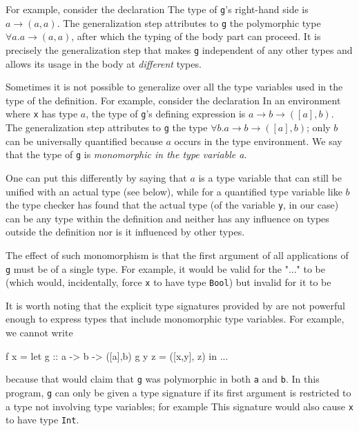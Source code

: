 For example, consider the declaration 
The type of \texttt{g}'s right-hand side is $a \rightarrow{} (a,a)$. The generalization step attributes to \texttt{g} the polymorphic type $\forall a. a \rightarrow{} (a,a)$, after which the typing of the body part can proceed. It is precisely the generalization step that makes \texttt{g} independent of any other types and allows its usage in the body at \emph{different} types.

Sometimes it is not possible to generalize over all the type variables used in the type of the definition. For example, consider the declaration  
In an environment where \texttt{x} has type $a$, the type of \texttt{g}'s defining expression is $a \rightarrow{} b \rightarrow{} ([a],b)$. The generalization step attributes to \texttt{g} the type $\forall{} b$.$a \rightarrow{} b \rightarrow{} ([a],b)$; only $b$ can be universally quantified because $a$ occurs in the type environment. We say that the type of \texttt{g} is \emph{monomorphic in the type variable a}.

One can put this differently by saying that $a$ is a type variable that  can still be unified with an actual type (see below), while for a quantified type variable like $b$ the type checker has found that the actual type (of the variable \texttt{y}, in our case) can be any type within the definition and neither has any influence on types outside the definition nor is it influenced by other types.

The effect of such monomorphism is that the first argument of all applications of \texttt{g} must be of a single type. For example, it would be valid for the "..." to be 
(which would, incidentally, force \texttt{x} to have type \texttt{Bool}) but invalid for it to be 

It is worth noting that the explicit type signatures provided by \frege{} are not powerful enough to express types that include monomorphic type variables.
For example, we cannot write
\begin{code}
    f x = let
            g :: a -> b -> ([a],b)
            g y z = ([x,y], z)
        in ...
\end{code}
because that would claim that \texttt{g} was polymorphic in both \texttt{a} and \texttt{b}. In this program, \texttt{g} can only be given a type signature if its first argument is restricted to a type not involving type variables; for example 
This signature would also cause \texttt{x} to have type \texttt{Int}.

